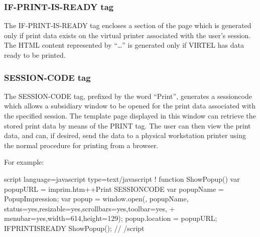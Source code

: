 \documentclass[letterpaper,10pt,english]{sphinxmanual}
\begin{document}

\subsubsection{IF-PRINT-IS-READY tag}
\label{\detokenize{User_Guide:index-6}}\label{\detokenize{User_Guide:if-print-is-ready-tag}}
\begin{sphinxVerbatim}[commandchars=\\\{\}]
   
\end{sphinxVerbatim}

The IF-PRINT-IS-READY tag encloses a section of the page which is generated only if print data exists on the virtual printer associated with the user’s session. The HTML content represented by “…” is
generated only if VIRTEL has data ready to be printed.


\subsubsection{SESSION-CODE tag}
\label{\detokenize{User_Guide:session-code-tag}}\label{\detokenize{User_Guide:index-7}}
The SESSION-CODE tag, prefixed by the word “Print”, generates a sessioncode which allows a subsidiary window to be opened for the print data associated with the specified session. The template page displayed in this window can retrieve the stored print data by means of the PRINT tag. The user can then view the print data, and can, if desired, send the data to a physical workstation printer using the normal procedure for printing from a browser.

For example:

\begin{sphinxVerbatim}[commandchars=\\\{\}]
\PYGZlt{}script language=\PYGZdq{}javascript\PYGZdq{} type=\PYGZdq{}text/javascript\PYGZdq{}\PYGZgt{}
\PYGZlt{}!\PYGZhy{}\PYGZhy{}
    function ShowPopup()
    \PYGZob{}
        var popupURL = \PYGZdq{}imprim.htm++Print\PYGZob{}\PYGZob{}\PYGZob{} SESSION\PYGZhy{}CODE \PYGZcb{}\PYGZcb{}\PYGZcb{}\PYGZdq{}
        var popupName = \PYGZdq{}PopupImpression\PYGZdq{};
        var popup = window.open(\PYGZdq{}\PYGZdq{}, popupName,
            \PYGZsq{}status=yes,resizable=yes,scrollbars=yes,toolbar=yes,\PYGZsq{} +
            \PYGZsq{}menubar=yes,width=614,height=129\PYGZsq{});
        popup.location = popupURL;
    \PYGZcb{}
    \PYGZob{}\PYGZob{}\PYGZob{}IF\PYGZhy{}PRINT\PYGZhy{}IS\PYGZhy{}READY
        ShowPopup();
    \PYGZcb{}\PYGZcb{}\PYGZcb{}
// \PYGZhy{}\PYGZhy{}\PYGZgt{}
\PYGZlt{}/script\PYGZgt{}
\end{sphinxVerbatim}
\end{document}
